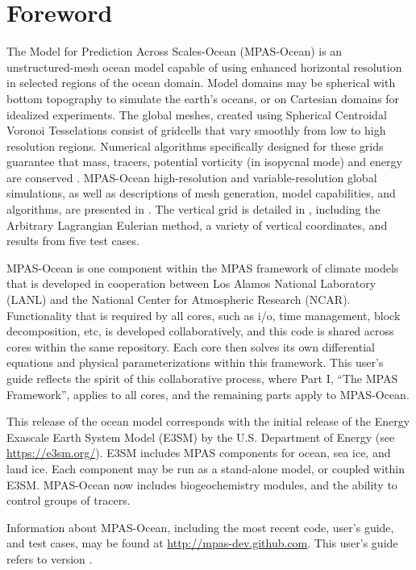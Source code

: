 \chapter*{Foreword}
\label{chap:foreword}
The Model for Prediction Across Scales-Ocean (MPAS-Ocean) is an unstructured-mesh ocean model capable of using enhanced horizontal resolution in selected regions of the ocean domain.  Model domains may be spherical with bottom topography to simulate the earth's oceans, or on Cartesian domains for idealized experiments.  The global meshes, created using Spherical Centroidal Voronoi Tesselations \citep{Ringler_ea08od,Ringler_ea11mwr} consist of gridcells that vary smoothly from low to high resolution regions. Numerical algorithms specifically designed for these grids guarantee that mass, tracers, potential vorticity (in isopycnal mode) and energy are conserved \citep{Thurburn_ea09jcp,Ringler_ea10jcp}.  MPAS-Ocean high-resolution and variable-resolution global simulations, as well as descriptions of mesh generation, model capabilities, and algorithms, are presented in \citet{Ringler_ea13om}.  The vertical grid is detailed in \citet{Petersen_ea14om}, including the Arbitrary Lagrangian Eulerian method, a variety of vertical coordinates, and results from five test cases.

MPAS-Ocean is one component within the MPAS framework of climate models that is developed in cooperation between Los Alamos National Laboratory (LANL) and the National Center for Atmospheric Research (NCAR).  Functionality that is required by all cores, such as i/o, time management, block decomposition, etc, is developed collaboratively, and this code is shared across cores within the same repository.  Each core then solves its own differential equations and physical parameterizations within this framework.  This user's guide reflects the spirit of this collaborative process, where Part I, ``The MPAS Framework'', applies to all cores, and the remaining parts apply to MPAS-Ocean.

This release of the ocean model corresponds with the initial release of the Energy Exascale Earth System Model (E3SM) by the U.S. Department of Energy (see \href{https://e3sm.org}{https://e3sm.org/}).  E3SM includes MPAS components for ocean, sea ice, and land ice.  Each component may be run as a stand-alone model, or coupled within E3SM.  MPAS-Ocean now includes biogeochemistry modules, and the ability to control groups of tracers.

Information about MPAS-Ocean, including the most recent code, user's guide, and test cases, may be found at \url{http://mpas-dev.github.com}.  This user's guide refers to version \version.


